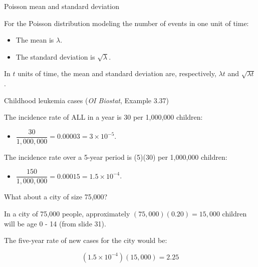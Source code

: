 \documentclass[ignorenonframetext,aspectratio=169]{beamer}
\providecommand{\tightlist}{%
  \setlength{\itemsep}{0pt}\setlength{\parskip}{0pt}}
\begin{document}
\begin{frame}{Poisson mean and standard deviation}

For the Poisson distribution modeling the number of events in one unit
of time:

\begin{itemize}
\item
  The mean is \(\lambda\).
\item
  The standard deviation is \(\sqrt{\lambda}\).
\end{itemize}

In \(t\) units of time, the mean and standard deviation are,
respectively, \(\lambda t\) and \(\sqrt{\lambda t}\).

\end{frame}

\begin{frame}{Childhood leukemia cases (\emph{OI Biostat}, Example
3.37)}

The incidence rate of ALL in a year is 30 per 1,000,000 children:

\begin{itemize}
\tightlist
\item
  \(\dfrac{30}{1,000,000}= 0.00003 = 3\times 10^{-5}\).
\end{itemize}

The incidence rate over a 5-year period is (5)(30) per 1,000,000
children:

\begin{itemize}
\tightlist
\item
  \(\dfrac{150}{1,000,000} = 0.00015 = 1.5 \times 10^{-4}\).
\end{itemize}

\end{frame}

\begin{frame}{What about a city of size 75,000?}

In a city of 75,000 people, approximately \((75,000)(0.20) = 15,000\)
children will be age 0 - 14 (from slide 31).

The five-year rate of new cases for the city would be:

\[(1.5 \times 10^{-4})(15,000) = 2.25\]

\end{frame}
\end{document}
